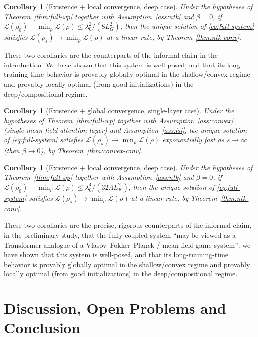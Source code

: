 \documentclass[11pt,a4wide]{article}
\newtheorem{corollary}[theorem]{Corollary}
\theoremstyle{definition}
\begin{document}
\begin{corollary}[Existence + local convergence, deep case]
Under the hypotheses of Theorem~\ref{thm:full-wp} together with Assumption~\ref{ass:ntk} and $\beta=0$, if $\mathcal L(\rho_0)-\min_\rho\mathcal L(\rho)\le \lambda_0^2/(8L_G^2)$, then the unique solution of \eqref{eq:full-system} satisfies $\mathcal L(\rho_s)\to\min_\rho\mathcal L(\rho)$ at a linear rate, by Theorem~\ref{thm:ntk-conv}.
\end{corollary}

These two corollaries are the counterparts of the informal claim in the introduction.  We have shown that this system is well-posed, and that its long-training-time behavior is provably globally optimal in the shallow/convex regime and provably locally optimal (from good initializations) in the deep/compositional regime.
\fi

\begin{corollary}[Existence + global convergence, single-layer case]
Under the hypotheses of Theorem~\ref{thm:full-wp} together with Assumption~\ref{ass:convex} (single mean-field attention layer) and Assumption~\ref{ass:lsi}, the unique solution of \eqref{eq:full-system} satisfies $\mathcal L(\rho_s)\to\min_\rho\mathcal L(\rho)$ exponentially fast as $s\to\infty$ (then $\beta\to0$), by Theorem~\ref{thm:convex-conv}.
\end{corollary}

\begin{corollary}[Existence + local convergence, deep case]
Under the hypotheses of Theorem~\ref{thm:full-wp} together with Assumption~\ref{ass:ntk} and $\beta=0$, if $\mathcal L(\rho_0)-\min_\rho\mathcal L(\rho)\le \lambda_0^4/(32 \Lambda L_K^2)$, then the unique solution of \eqref{eq:full-system} satisfies $\mathcal L(\rho_s)\to\min_\rho\mathcal L(\rho)$ at a linear rate, by Theorem~\ref{thm:ntk-conv}.
\end{corollary}

These two corollaries are the precise, rigorous counterparts of the informal claim, in the preliminary study, that the fully coupled system ``may be viewed as a Transformer analogue of a Vlasov--Fokker--Planck / mean-field-game system'': we have shown that this system is well-posed, and that its long-training-time behavior is provably globally optimal in the shallow/convex regime and provably locally optimal (from good initializations) in the deep/compositional regime.


\section{Discussion,  Open Problems and Conclusion}
\label{sec:discussion}
\end{document}
